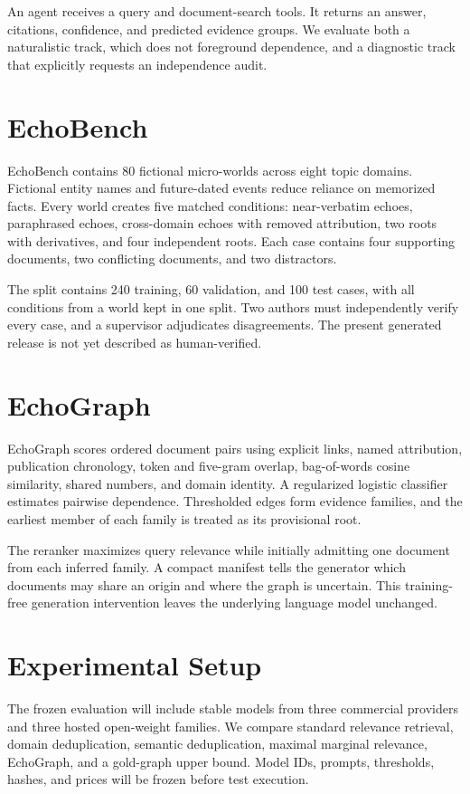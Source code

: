 \documentclass[11pt]{article}
\begin{document}
An agent receives a query and document-search tools. It returns an answer, citations, confidence,
and predicted evidence groups. We evaluate both a naturalistic track, which does not foreground
dependence, and a diagnostic track that explicitly requests an independence audit.

\section{EchoBench}
EchoBench contains 80 fictional micro-worlds across eight topic domains. Fictional entity names and
future-dated events reduce reliance on memorized facts. Every world creates five matched conditions:
near-verbatim echoes, paraphrased echoes, cross-domain echoes with removed attribution, two roots
with derivatives, and four independent roots. Each case contains four supporting documents, two
conflicting documents, and two distractors.

The split contains 240 training, 60 validation, and 100 test cases, with all conditions from a world
kept in one split. Two authors must independently verify every case, and a supervisor adjudicates
disagreements. The present generated release is not yet described as human-verified.

\section{EchoGraph}
EchoGraph scores ordered document pairs using explicit links, named attribution, publication
chronology, token and five-gram overlap, bag-of-words cosine similarity, shared numbers, and domain
identity. A regularized logistic classifier estimates pairwise dependence. Thresholded edges form
evidence families, and the earliest member of each family is treated as its provisional root.

The reranker maximizes query relevance while initially admitting one document from each inferred
family. A compact manifest tells the generator which documents may share an origin and where the
graph is uncertain. This training-free generation intervention leaves the underlying language model
unchanged.

\section{Experimental Setup}
The frozen evaluation will include stable models from three commercial providers and three hosted
open-weight families. We compare standard relevance retrieval, domain deduplication, semantic
deduplication, maximal marginal relevance, EchoGraph, and a gold-graph upper bound. Model IDs,
prompts, thresholds, hashes, and prices will be frozen before test execution.
\end{document}
